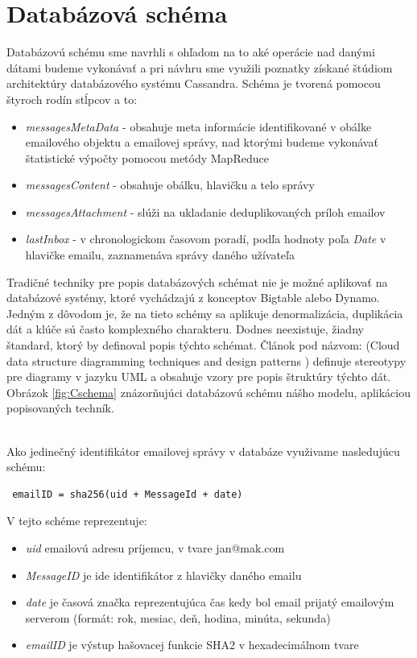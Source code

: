 \documentclass[11pt,twoside,a4paper]{book}
\begin{document}

\section{Databázová schéma}

Databázovú schému sme navrhli s ohľadom na to aké operácie nad danými dátami budeme vykonávať a pri návhru sme využili poznatky získané štúdiom architektúry databázového systému Cassandra. Schéma je tvorená pomocou štyroch rodín stĺpcov a to:

\begin{itemize}
 \item \emph{messagesMetaData} - obsahuje meta informácie identifikované v obálke emailového objektu a emailovej správy, nad ktorými budeme vykonávať štatistické výpočty pomocou metódy MapReduce
 \item \emph{messagesContent} - obsahuje obálku, hlavičku a telo správy
 \item \emph{messagesAttachment} - slúži na ukladanie deduplikovaných príloh emailov  
 \item \emph{lastInbox} - v chronologickom časovom poradí, podľa hodnoty poľa \emph{Date} v hlavičke emailu, zaznamenáva správy daného užívateľa
\end{itemize}

Tradičné techniky pre popis databázových schémat nie je možné aplikovať na databázové systémy, ktoré vychádzajú z konceptov Bigtable alebo Dynamo. Jedným z dôvodom je, že na tieto schémy sa aplikuje denormalizácia, duplikácia dát a klúče sú často komplexného charakteru. Dodnes neexistuje, žiadny štandard, ktorý by definoval popis týchto schémat. Článok pod názvom:  (Cloud data structure diagramming techniques and design patterns \cite{CloudDataStructureDiag}) definuje stereotypy pre diagramy v jazyku UML a obsahuje vzory pre popis štruktúry týchto dát. Obrázok \ref{fig:Cschema} znázorňujúci databázovú schému nášho modelu, aplikáciou popisovaných techník.

\noindent
\\
Ako jedinečný identifikátor emailovej správy v databáze využivame nasledujúcu schému:
\begin{verbatim}
 emailID = sha256(uid + MessageId + date)
\end{verbatim}

\noindent
V tejto schéme reprezentuje:
\begin{itemize}
 \item \emph{uid} emailovú adresu príjemcu, v tvare jan@mak.com
 \item \emph{MessageID} je ide identifikátor z hlavičky daného emailu
 \item \emph{date} je časová značka reprezentujúca čas kedy bol email prijatý emailovým serverom (formát: rok, mesiac, deň, hodina, minúta, sekunda)
 \item \emph{emailID} je výstup hašovacej funkcie SHA2 v hexadecimálnom tvare
\end{itemize}
\end{document}
